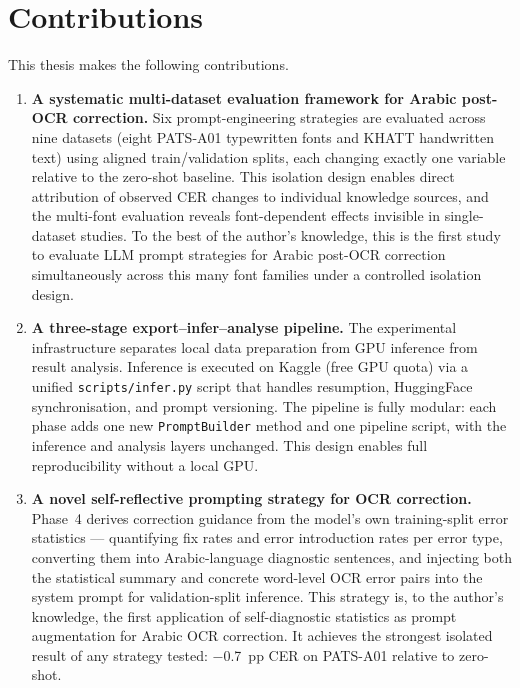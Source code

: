\section{Contributions}
\label{sec:intro_contributions}

This thesis makes the following contributions.

\begin{enumerate}

  \item \textbf{A systematic multi-dataset evaluation framework for Arabic
  post-OCR correction.} Six prompt-engineering strategies are evaluated
  across nine datasets (eight PATS-A01 typewritten fonts and KHATT
  handwritten text) using aligned train/validation splits, each changing
  exactly one variable relative to the zero-shot baseline. This isolation
  design enables direct attribution of observed CER changes to individual
  knowledge sources, and the multi-font evaluation reveals font-dependent
  effects invisible in single-dataset studies. To the best of the author's
  knowledge, this is the first study to evaluate LLM prompt strategies for
  Arabic post-OCR correction simultaneously across this many font families
  under a controlled isolation design.

  \item \textbf{A three-stage export--infer--analyse pipeline.} The
  experimental infrastructure separates local data preparation from GPU
  inference from result analysis. Inference is executed on Kaggle (free GPU
  quota) via a unified \texttt{scripts/infer.py} script that handles
  resumption, HuggingFace synchronisation, and prompt versioning. The
  pipeline is fully modular: each phase adds one new \texttt{PromptBuilder}
  method and one pipeline script, with the inference and analysis layers
  unchanged. This design enables full reproducibility without a local GPU.

  \item \textbf{A novel self-reflective prompting strategy for OCR
  correction.} Phase~4 derives correction guidance from the model's own
  training-split error statistics --- quantifying fix rates and error
  introduction rates per error type, converting them into Arabic-language
  diagnostic sentences, and injecting both the statistical summary and
  concrete word-level OCR error pairs into the system prompt for
  validation-split inference. This strategy is, to the author's knowledge,
  the first application of self-diagnostic statistics as prompt augmentation
  for Arabic OCR correction. It achieves the strongest isolated result of any
  strategy tested: $-$0.7~pp CER on PATS-A01 relative to zero-shot.


\end{enumerate}
